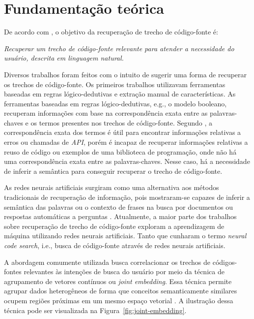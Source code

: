 \chapter{Fundamentação teórica}
\label{cap:fundamentacao-teorica}

De acordo com \cite{Chen-bi-variational-autoencoder:2018}, o objetivo da recuperação de trecho de código-fonte é:

\emph{Recuperar um trecho de código-fonte relevante para atender a necessidade do usuário, descrita em linguagem natural.}

Diversos trabalhos foram feitos com o intuito de sugerir uma forma de recuperar os trechos de código-fonte. Os primeiros trabalhos utilizavam ferramentas baseadas em regras lógico-dedutivas e extração manual de características. As ferramentas baseadas em regras lógico-dedutivas, e.g., o modelo booleano, recuperam informações com base na correspondência exata entre as palavras-chaves e os termos presentes nos trechos de código-fonte. Segundo \cite{yan-benchmark-code-search-information-retrieval-deep-learning:2020}, a correspondência exata dos termos é útil para encontrar informações relativas a erros ou chamadas de \textit{API}, porém é incapaz de recuperar informações relativas a reuso de código ou exemplos de uma biblioteca de programação, onde não há uma correspondência exata entre as palavras-chaves. Nesse caso, há a necessidade de inferir a semântica para conseguir recuperar o trecho de código-fonte.

As redes neurais artificiais surgiram como uma alternativa aos métodos tradicionais de recuperação de informação, pois mostraram-se capazes de inferir a semântica das palavras ou o contexto de frases na busca por documentos ou respostas automáticas a perguntas \citep{guo-deep-look-into-neural-ranking-models:2019}. Atualmente, a maior parte dos trabalhos sobre recuperação de trecho de código-fonte exploram a aprendizagem de máquina utilizando redes neurais artificiais. Tanto que \cite{cambronero-deep-learning-code-search:2019} cunharam o termo \textit{neural code search}, i.e., busca de código-fonte através de redes neurais artificiais. 

A abordagem comumente utilizada busca correlacionar os trechos de códigos-fontes relevantes às intenções de busca do usuário por meio da técnica de agrupamento de vetores contínuos ou \textit{joint embedding}. Essa técnica permite agrupar dados heterogêneos de forma que conceitos semanticamente similares ocupem regiões próximas em um mesmo espaço vetorial \citep{devise-deep-visual-semantic-embedding-frome-2013}. A ilustração dessa técnica pode ser visualizada na Figura~\ref{fig:joint-embedding}.

